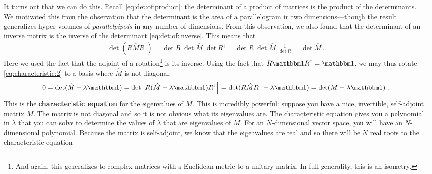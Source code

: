\documentclass[12pt]{article}
\begin{document}
It turns out that we can do this. Recall \eqref{eq:det:of:product}: the determinant of a product of matrices is the product of the determinants. We motivated this from the observation that the determinant is the area of a parallelogram in two dimensions---though the result generalizes hyper-volumes of \emph{parallelpipeds} in any number of dimensions. From this observation, we also found that the determinant of an inverse matrix is the inverse of the determinant \eqref{eq:det:of:inverse}. This means that
\begin{align}
    \det(R\hat M R^\dag) = 
    \det R \; \det \hat M \; \det R^\dag
    =
    \det R \; \det \hat M \; \frac{1}{\det R}
    =
    \det \hat M \ .
\end{align}
Here we used the fact that the adjoint of a rotation\footnote{And again, this generalizes to complex matrices with a Euclidean metric to a unitary matrix. In full generality, this is an isometry.} is its inverse. Using the fact that $R\one R^\dag = \one$, we may thus rotate \eqref{eq:characteristic:2} to a basis where $\hat M$ is not diagonal:
\begin{align}
     0=\det(\hat M - \lambda \one) 
     = \det\left[R(\hat M - \lambda \one)R^\dag\right]
     = \det(R\hat M R^\dag - \lambda \one) 
     = \det(M - \lambda \one) 
     \label{eq:characteristic:equation} \ .
\end{align}
This is the \textbf{characteristic equation} for the eigenvalues of $M$. This is incredibly powerful: suppose you have a nice, invertible, self-adjoint matrix $M$. The matrix is not diagonal and so it is not obvious what its eigenvalues are. The characteristic equation gives you a polynomial in $\lambda$ that you can solve to determine the values of $\lambda$ that are eigenvalues of $M$. For an $N$-dimensional vector space, you will have an $N$-dimensional polynomial. Because the matrix is self-adjoint, we know that the eigenvalues are real and so there will be $N$ real roots to the characteristic equation.
\end{document}

